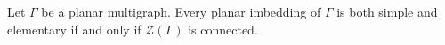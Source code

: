Let $\Gamma$ be a planar multigraph. Every planar imbedding of $\Gamma$ is both simple and elementary if and only if $\mathcal{Z}(\Gamma)$ is connected.
